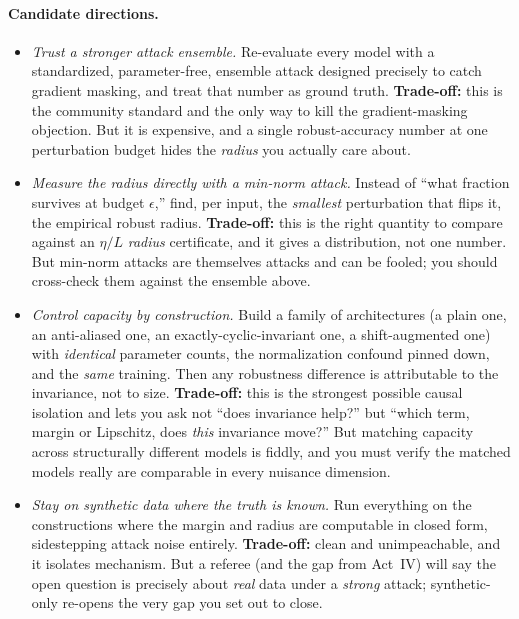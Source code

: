 \paragraph{Candidate directions.}
\begin{itemize}[leftmargin=1.4em]
  \item \emph{Trust a stronger attack ensemble.} Re-evaluate every model with a standardized,
        parameter-free, ensemble attack designed precisely to catch gradient masking, and treat that
        number as ground truth. \textbf{Trade-off:} this is the community standard and the only way to
        kill the gradient-masking objection. But it is expensive, and a single robust-accuracy number
        at one perturbation budget hides the \emph{radius} you actually care about.
  \item \emph{Measure the radius directly with a min-norm attack.} Instead of ``what fraction
        survives at budget $\epsilon$,'' find, per input, the \emph{smallest} perturbation that flips
        it, the empirical robust radius. \textbf{Trade-off:} this is the right quantity to compare
        against an $\eta/L$ \emph{radius} certificate, and it gives a distribution, not one number.
        But min-norm attacks are themselves attacks and can be fooled; you should cross-check them
        against the ensemble above.
  \item \emph{Control capacity by construction.} Build a family of architectures (a plain one, an
        anti-aliased one, an exactly-cyclic-invariant one, a shift-augmented one) with
        \emph{identical} parameter counts, the normalization confound pinned down, and the
        \emph{same} training. Then any robustness difference is attributable to the invariance, not
        to size. \textbf{Trade-off:} this is the strongest possible causal isolation and lets you ask
        not ``does invariance help?'' but ``which term, margin or Lipschitz, does \emph{this}
        invariance move?'' But matching capacity across structurally different models is fiddly, and
        you must verify the matched models really are comparable in every nuisance dimension.
  \item \emph{Stay on synthetic data where the truth is known.} Run everything on the constructions
        where the margin and radius are computable in closed form, sidestepping attack noise
        entirely. \textbf{Trade-off:} clean and unimpeachable, and it isolates mechanism. But a
        referee (and the gap from Act~IV) will say the open question is precisely about
        \emph{real} data under a \emph{strong} attack; synthetic-only re-opens the very gap you set
        out to close.
\end{itemize}

